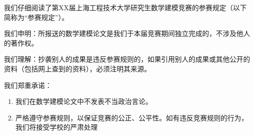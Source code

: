 \documentclass[bwprint]{suesmmthesis}
\begin{document}
    \thispagestyle{empty}
    \begin{center}
        
        \vspace{0.5cm}
        
    \end{center}
    \begin{flushleft}
        \setlength{\baselineskip}{1.2\baselineskip}

        \hspace{2em}我们仔细阅读了第XX届上海工程技术大学研究生数学建模竞赛的参赛规定（以下简称为“参赛规定”）。

        \hspace{2em}我们申明：所报送的数学建模论文是我们于本届竞赛期间独立完成的，不涉及他人的著作权。

        \hspace{2em}我们理解：抄袭别人的成果是违反参赛规则的，如果引用别人的成果或其他公开的资料（包括网上查到的资料），必须注明其来源。

        \hspace{2em}我们郑重承诺：
        \begin{enumerate}[label=(\arabic*)]
            \item 我们在数学建模论文中不发表不当政治言论。
            \item 严格遵守参赛规则，以保证竞赛的公正、公平性。如有违反竞赛规则的行为，我们将接受学校的严肃处理
        \end{enumerate}
    \end{flushleft}

    \vskip1.0cm
\end{document}
